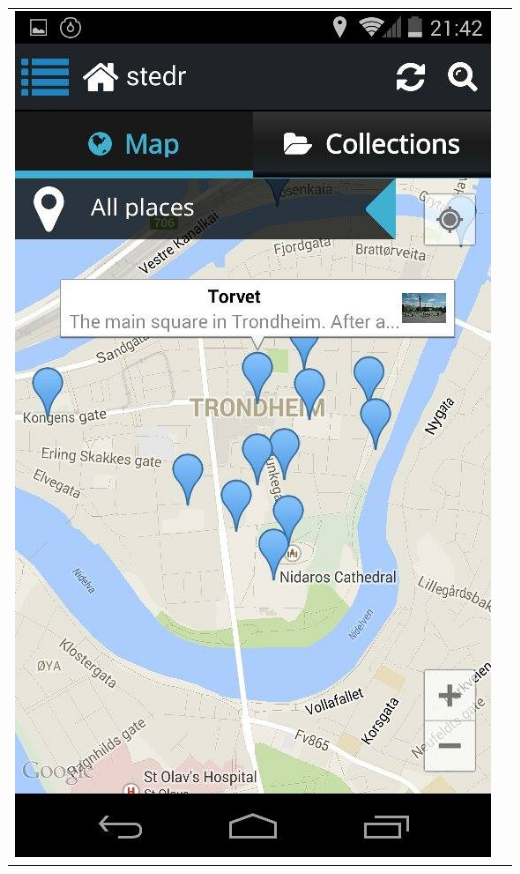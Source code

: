 \documentclass[12pt,a4paper,titlepage]{article}
\begin{document}
\begin{appendices}
\begin{center}
\begin{tabular}{cc}
	 	\includegraphics[width=0.35 \textwidth]{res/ScreenShot8.jpg}\\
\end{tabular}
\end{center}



\end{appendices}
\end{document}
